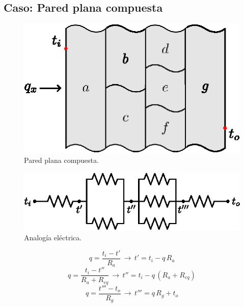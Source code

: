 \subsection{Caso: Pared plana compuesta}
\begin{figure}[!h]
\centering
\includegraphics[scale=1.20]{figura02_08.eps}
\caption{Pared plana compuesta.}
\end{figure}

\begin{figure}[!h]
\centering
\includegraphics[scale=1.20]{figura02_09.eps}
\caption{Analogía eléctrica.}
\end{figure}

\begin{equation*}
    q=\frac{t_i-t'}{R_a}\,\rightarrow\,t'=t_i-q\,R_a
\end{equation*}
\begin{equation*}
    q=\frac{t_i-t''}{R_a+R_{eq}}\,\rightarrow\,t''=t_i-q\,(R_a+R_{eq})
\end{equation*}
\begin{equation*}
    q=\frac{t'''-t_o}{R_g}\,\rightarrow\,t'''=q\,R_g+t_o
\end{equation*}

